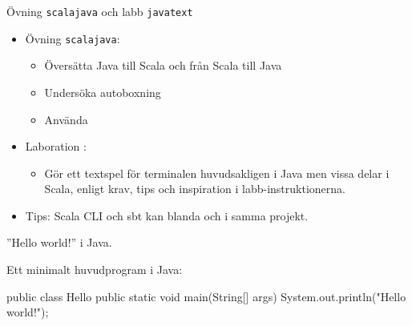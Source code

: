 



\begin{Slide}{Övning \texttt{scalajava} och labb \texttt{javatext}}\SlideFontSmall
\begin{itemize}
\item Övning \texttt{scalajava}:
\begin{itemize}\SlideFontTiny
\item Översätta Java till Scala och från Scala till Java
\item Undersöka autoboxning 
\item Använda 
\end{itemize}
\item Laboration :
\begin{itemize}\SlideFontTiny
  \item Gör ett textspel för terminalen huvudsakligen i Java men vissa delar i Scala, enligt krav, tips och inspiration i labb-instruktionerna.

\end{itemize}
\item Tips: Scala CLI och sbt kan blanda  och  i samma projekt.
\end{itemize}
\end{Slide}


\begin{Slide}{''Hello world!'' i Java.}

\noindent Ett minimalt huvudprogram i Java:
\begin{Code}[language=Java]
public class Hello {
    public static void main(String[] args) {
        System.out.println("Hello world!");
    }
}
\end{Code}


\end{Slide}


